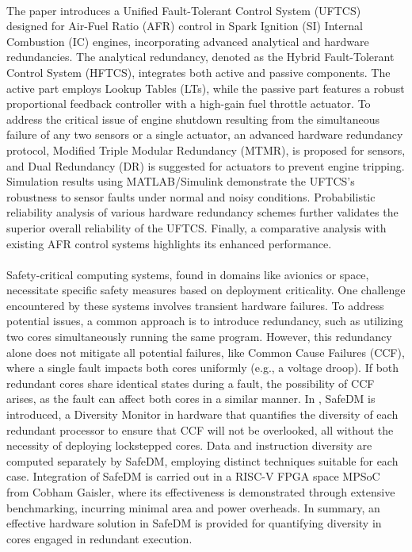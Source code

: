 \paragraph*{}
The paper \cite{Amin2022} introduces a Unified Fault-Tolerant Control System (UFTCS) designed for Air-Fuel Ratio (AFR) control in Spark Ignition (SI) Internal Combustion (IC) engines, incorporating advanced analytical and hardware redundancies. The analytical redundancy, denoted as the Hybrid Fault-Tolerant Control System (HFTCS), integrates both active and passive components. The active part employs Lookup Tables (LTs), while the passive part features a robust proportional feedback controller with a high-gain fuel throttle actuator. To address the critical issue of engine shutdown resulting from the simultaneous failure of any two sensors or a single actuator, an advanced hardware redundancy protocol, Modified Triple Modular Redundancy (MTMR), is proposed for sensors, and Dual Redundancy (DR) is suggested for actuators to prevent engine tripping. Simulation results using MATLAB/Simulink demonstrate the UFTCS's robustness to sensor faults under normal and noisy conditions. Probabilistic reliability analysis of various hardware redundancy schemes further validates the superior overall reliability of the UFTCS. Finally, a comparative analysis with existing AFR control systems highlights its enhanced performance.
\paragraph*{}
Safety-critical computing systems, found in domains like avionics or space, necessitate specific safety measures based on deployment criticality. One challenge encountered by these systems involves transient hardware failures. To address potential issues, a common approach is to introduce redundancy, such as utilizing two cores simultaneously running the same program. However, this redundancy alone does not mitigate all potential failures, like Common Cause Failures (CCF), where a single fault impacts both cores uniformly (e.g., a voltage droop). If both redundant cores share identical states during a fault, the possibility of CCF arises, as the fault can affect both cores in a similar manner. In \cite{9774540}, SafeDM is introduced, a Diversity Monitor in hardware that quantifies the diversity of each redundant processor to ensure that CCF will not be overlooked, all without the necessity of deploying lockstepped cores. Data and instruction diversity are computed separately by SafeDM, employing distinct techniques suitable for each case. Integration of SafeDM is carried out in a RISC-V FPGA space MPSoC from Cobham Gaisler, where its effectiveness is demonstrated through extensive benchmarking, incurring minimal area and power overheads. In summary, an effective hardware solution in SafeDM is provided for quantifying diversity in cores engaged in redundant execution.
